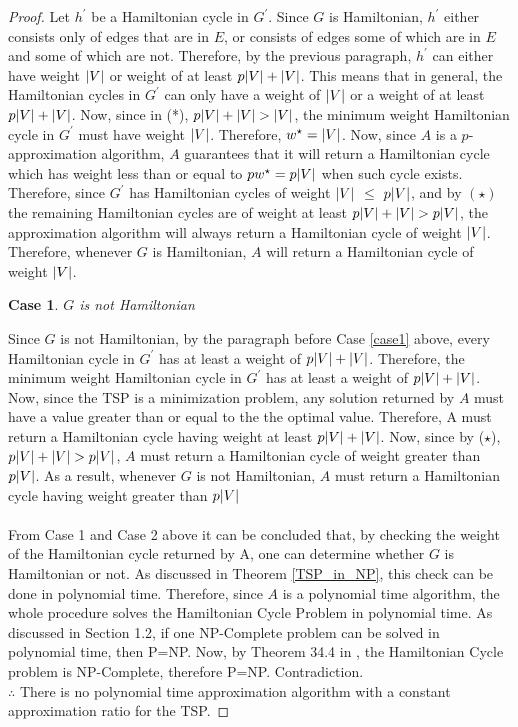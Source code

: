 \documentclass{article}
\newtheorem{case}{Case}
\begin{document}
\begin{proof}
Let $h^\prime$ be a Hamiltonian cycle in $G^\prime$. Since $G$ is Hamiltonian, $h^\prime$ either consists only of edges that are in $E$, or consists of edges some of which are in $E$ and some of which are not. Therefore, by the previous paragraph, $h^\prime$ can either have weight $\abs{V}$ or weight of at least $p\abs{V} + \abs{V}$. This means that in general, the Hamiltonian cycles in $G^\prime$ can only have a weight of $\abs{V}$ or a weight of at least $p\abs{V} + \abs{V}$. Now, since in (*), $p\abs{V} + \abs{V} > \abs{V}$, the minimum weight Hamiltonian cycle in $G^\prime$ must have weight $\abs{V}$. Therefore, $w^\star = \abs{V}$. Now, since $A$ is a $p$-approximation algorithm, $A$ guarantees that it will return a Hamiltonian cycle which has weight less than or equal to $pw^\star = p\abs{V}$ when such cycle exists. Therefore, since $G^\prime$ has Hamiltonian cycles of weight $\abs{V}$ $\leq$ $p\abs{V}$, and by $(\star)$ the remaining Hamiltonian cycles are of weight at least $ p\abs{V} + \abs{V} > p\abs{V}$, the approximation algorithm will always return a Hamiltonian cycle of weight $\abs{V}$. Therefore, whenever $G$ is Hamiltonian, $A$ will return a Hamiltonian cycle of weight $\abs{V}$.
\begin{case}
$G$ is not Hamiltonian
\end{case}
Since $G$ is not Hamiltonian, by the paragraph before Case \ref{case1} above, every Hamiltonian cycle in $G^\prime$ has at least a weight of $p\abs{V} + \abs{V}$. Therefore, the minimum weight Hamiltonian cycle in $G^\prime$ has at least a weight of $p\abs{V} + \abs{V}$. Now, since the TSP is a minimization problem, any solution returned by $A$ must have a value greater than or equal to the the optimal value. Therefore, A must return a Hamiltonian cycle having weight at least $p\abs{V} + \abs{V}$. Now, since by ($\star$), $p\abs{V} + \abs{V} > p\abs{V}$, $A$ must return a Hamiltonian cycle of weight greater than $p\abs{V}$. As a result, whenever $G$ is not Hamiltonian, $A$ must return a Hamiltonian cycle having weight greater than $p\abs{V}$ \\\\
From Case 1 and Case 2 above it can be concluded that, by checking the weight of the Hamiltonian cycle returned by A, one can determine whether $G$ is Hamiltonian or not. As discussed in Theorem \ref{TSP_in_NP}, this check can be done in polynomial time. Therefore, since $A$ is a polynomial time algorithm, the whole procedure solves the Hamiltonian Cycle Problem in polynomial time. As discussed in Section 1.2, if one NP-Complete problem can be solved in polynomial time, then P=NP. Now, by Theorem 34.4 in \cite{cormen_leiserson_rivest_stein}, the Hamiltonian Cycle problem is NP-Complete, therefore P=NP. Contradiction. \\
$\therefore$ There is no polynomial time approximation algorithm with a constant approximation ratio for the TSP.
\end{proof}
\end{document}
